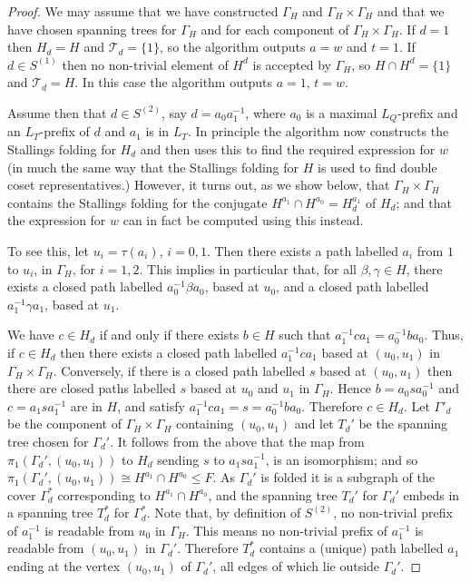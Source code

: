 \documentclass[a4paper,12pt]{article}
\renewcommand{\b}{\beta }
\newcommand{\G}{\Gamma }
\newcommand{\g}{\gamma }
\renewcommand{\t}{\tau }
\numberwithin{equation}{section}
\numberwithin{figure}{section}
\newcommand{\cT}{\mathcal{T}}
\begin{document}
\begin{proof}
We may assume that we have constructed $\G_H$ and $\G_H\times \G_H$ and
that we have chosen  spanning trees for $\G_H$ and for 
each component of 
 $\G_H\times \G_H$. 
If $d=1$ then $H_d=H$ and $\cT_d=\{1\}$, so the algorithm 
outputs $a=w$ and $t=1$.  
If $d\in S^{(1)}$ then no non-trivial element of $H^d$ is accepted 
by $\G_H$, so
$H\cap H^d=\{1\}$ and $\cT_d=H$. In this case the algorithm 
outputs $a=1$, $t=w$. 

Assume then that $d\in S^{(2)}$, say $d=a_0a_1^{-1}$, where 
$a_0$ is a maximal $L_Q$-prefix and an $L_T$-prefix of $d$ and $a_1$ is in 
$L_T$. 
In principle the algorithm  now constructs the 
Stallings folding for $H_d$ and then uses this to 
find the required expression for $w$ (in much the same 
way that the Stallings folding for $H$ is used to find double
coset representatives.) However, it turns out, as we show below, that
$\G_H\times \G_H$ contains the Stallings folding for the 
conjugate $H^{a_1}\cap H^{a_0}=H_d^{a_1}$ of $H_d$; and that 
the expression for $w$ can in fact be computed using this instead. 

To see this, let $u_i=\t(a_i)$, $i=0,1$. Then there exists
a path labelled $a_i$ from $1$ to $u_i$, in $\G_H$, for $i=1,2$.
 This implies in particular that, for 
all $\b,\g\in H$, there exists 
a closed path labelled $a_0^{-1}\b a_0$, based at 
$u_0$, and  a closed path labelled $a_1^{-1}\g a_1$, based at 
$u_1$. 

We have $c\in H_d$ if and only if there exists $b\in H$ such that
$a_1^{-1}ca_1=a_0^{-1}ba_0$. Thus, if $c\in H_d$ then 
 there exists a closed path
labelled $a_1^{-1}ca_1$ based at $(u_0,u_1)$ in $\G_H\times \G_H$. 
Conversely, if there is a closed path labelled $s$ based at 
$(u_0,u_1)$ then there are closed paths labelled 
$s$ based at $u_0$ and $u_1$ in $\G_H$. Hence 
$b=a_0sa_0^{-1}$ and $c=a_1sa_1^{-1}$ are in $H$, 
and satisfy $a_1^{-1}c a_1=s=a_0^{-1}ba_0$. Therefore $c \in H_d$. 
 Let $\G'_d$ be the component of $\G_H\times \G_H$
containing $(u_0,u_1)$ and let $T_d'$ be the spanning tree 
chosen for $\G_d'$. It follows from the above that the map
from $\pi_1(\G_d', (u_0,u_1))$ to $H_d$ sending $s$ to $a_1sa_1^{-1}$, is 
an isomorphism; and so  
$\pi_1(\G_d', (u_0,u_1))\cong H^{a_1}\cap H^{a_0}\le F$.
As $\G_d'$ is folded it is a subgraph of the cover
$\G_d^*$ corresponding to  $H^{a_1}\cap H^{a_0}$, and the spanning tree $T_d'$ for 
$\G_d'$ embeds in a spanning tree $T_d^*$ for $\G_d^*$. 
Note that, by definition of $S^{(2)}$, no non-trivial prefix of 
$a_1^{-1}$ is readable from $u_0$ in $\G_H$. This means no non-trivial
prefix of $a_1^{-1}$ is readable from $(u_0,u_1)$ in $\G_d'$. Therefore
$T_d^*$ contains a (unique) path  labelled $a_1$ ending
at the vertex $(u_0,u_1)$ of $\G_d'$, all edges of which lie 
outside $\G_d'$. 


\end{proof}
\end{document}

